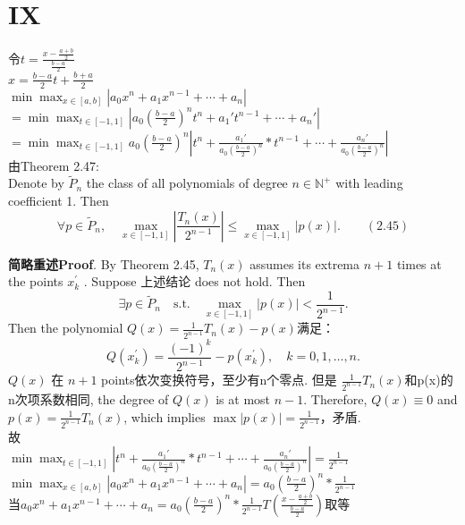 \documentclass[a4paper]{article}
\begin{document}
\section*{IX}
令$t=\frac{x-\frac{a+b}{2}}{\frac{b-a}{2}}$\\
$x=\frac{b-a}{2}t+\frac{b+a}{2}$\\
$\min \max_{x \in [a, b]} \left| a_0 x^n + a_1 x^{n-1} + \cdots + a_n \right|$\\
$=\min \max_{t \in [-1, 1]} | a_0 (\frac{b-a}{2})^n t^n + a_1' t^{n-1} + \cdots + a_n' |$\\
$=\min \max_{t \in [-1, 1]} a_0 (\frac{b-a}{2})^n| t^n + \frac{a_1'}{a_0 (\frac{b-a}{2})^n}* t^{n-1} + \cdots + \frac{a_n'}{a_0 (\frac{b-a}{2})^n} |$\\
由Theorem 2.47:\\
Denote by $\tilde{P}_{n}$ the class of all polynomials of degree $n\in \mathbb{N}^{+}$ with leading coefficient 1. Then
\[
\forall p \in \tilde{P}_{n}, \quad \max_{x \in [-1,1]} \left| \frac{T_{n}(x)}{2^{n-1}} \right| \leq \max_{x \in [-1,1]} \left| p(x) \right|. \qquad (2.45)
\]

\textbf{简略重述Proof}. By Theorem 2.45, $T_{n}(x)$ assumes its extrema $n+1$ times at the points $x_{k}^{\prime}$ . Suppose 上述结论 does not hold. Then
\[
\exists p \in \tilde{P}_{n} \quad \text{s.t.} \quad \max_{x \in [-1,1]} \left| p(x) \right| < \frac{1}{2^{n-1}}. 
\]
Then the polynomial $Q(x) = \frac{1}{2^{n-1}} T_n(x) - p(x)$满足：\\
\[
Q(x_{k}^{\prime}) = \frac{(-1)^{k}}{2^{n-1}} - p(x_{k}^{\prime}), \quad k = 0, 1, \ldots, n.
\]
 $Q(x)$ 在 $n+1$ points依次变换符号，至少有n个零点. 但是 $\frac{1}{2^{n-1}} T_n(x)$和p(x)的n次项系数相同, the degree of $Q(x)$ is at most $n-1$. Therefore, $Q(x) \equiv 0$ and $p(x) = \frac{1}{2^{n-1}} T_{n}(x)$, which implies $\max |p(x)| = \frac{1}{2^{n-1}}$，矛盾. \\
故\\
$\min \max_{t \in [-1, 1]} | t^n + \frac{a_1'}{a_0 (\frac{b-a}{2})^n}* t^{n-1} + \cdots + \frac{a_n'}{a_0 (\frac{b-a}{2})^n}|=\frac{1}{2^{n-1}}$\\
$\min \max_{x \in [a, b]} \left| a_0 x^n + a_1 x^{n-1} + \cdots + a_n \right|=a_0 (\frac{b-a}{2})^n*\frac{1}{2^{n-1}}$\\
当$a_0 x^n + a_1 x^{n-1} + \cdots + a_n=a_0 (\frac{b-a}{2})^n*\frac{1}{2^{n-1}} T(\frac{x-\frac{a+b}{2}}{\frac{b-a}{2}})$取等\\
\end{document}
